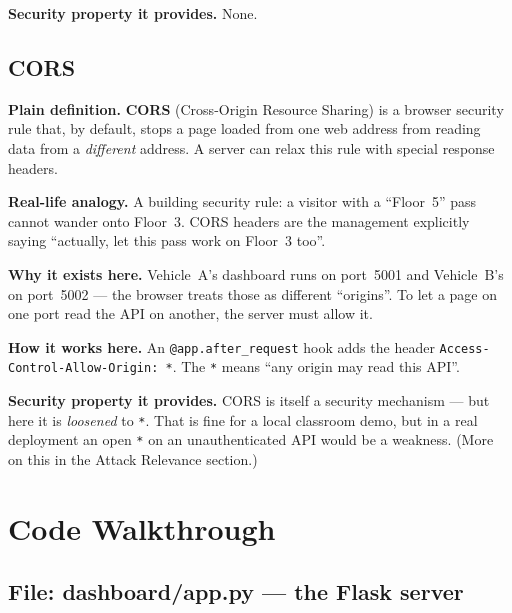 \documentclass[11pt,a4paper]{article}
\begin{document}
\textbf{Security property it provides.} None.

\subsection{CORS}
\textbf{Plain definition.} \textbf{CORS} (Cross-Origin Resource Sharing) is a
browser security rule that, by default, stops a page loaded from one web address
from reading data from a \emph{different} address. A server can relax this rule
with special response headers.

\textbf{Real-life analogy.} A building security rule: a visitor with a ``Floor~5''
pass cannot wander onto Floor~3. CORS headers are the management explicitly
saying ``actually, let this pass work on Floor~3 too''.

\textbf{Why it exists here.} Vehicle~A's dashboard runs on port~5001 and
Vehicle~B's on port~5002 --- the browser treats those as different ``origins''.
To let a page on one port read the API on another, the server must allow it.

\textbf{How it works here.} An \texttt{@app.after\_request} hook adds the header
\texttt{Access-Control-Allow-Origin: *}. The \texttt{*} means ``any origin may
read this API''.

\textbf{Security property it provides.} CORS is itself a security mechanism ---
but here it is \emph{loosened} to \texttt{*}. That is fine for a local classroom
demo, but in a real deployment an open \texttt{*} on an unauthenticated API would
be a weakness. (More on this in the Attack Relevance section.)

\section{Code Walkthrough}

\subsection{File: dashboard/app.py --- the Flask server}
\end{document}
